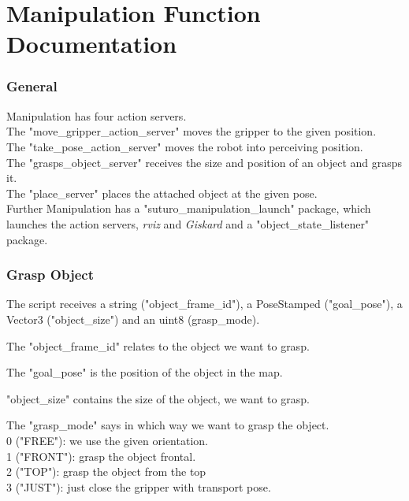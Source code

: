 \documentclass[main.tex]{subfiles}
\begin{document}
	\begingroup

	\renewcommand{\cleardoublepage}{}

	\renewcommand{\clearpage}{}

	\chapter{Manipulation Function Documentation}


		
		\subsection{General}

		Manipulation has four action servers.\\
		The "move\_gripper\_action\_server" moves the gripper to the given position.\\
		The "take\_pose\_action\_server" moves the robot into perceiving position.\\
		The "grasps\_object\_server" receives the size and position of an object and grasps it.\\
		The "place\_server" places the attached object at the given pose.\\
		Further Manipulation has a "suturo\_manipulation\_launch" package, which launches the action servers, \textit{rviz} and \textit{Giskard} and a "object\_state\_listener" package.

		\subsection{Grasp Object} 
			The script receives a string ("object\_frame\_id"), a PoseStamped ("goal\_pose"), a Vector3 ("object\_size") and an uint8 (grasp\_mode).
			
			\vspace{0,25 cm}
			The "object\_frame\_id" relates to the object we want to grasp.
		
			\vspace{0,25 cm}
			The "goal\_pose" is the position of the object in the map.

			\vspace{0,25 cm}
			"object\_size" contains the size of the object, we want to grasp.
			
			\vspace{0,25 cm}
			The "grasp\_mode" says in which way we want to grasp the object. \\ 
			0 ("FREE"): we use the given orientation.\\
			 1 ("FRONT"): grasp the object frontal.\\
			 2 ("TOP"): grasp the object from the top\\
			 3 ("JUST"): just close the gripper with transport pose.
			 
\end{document}
